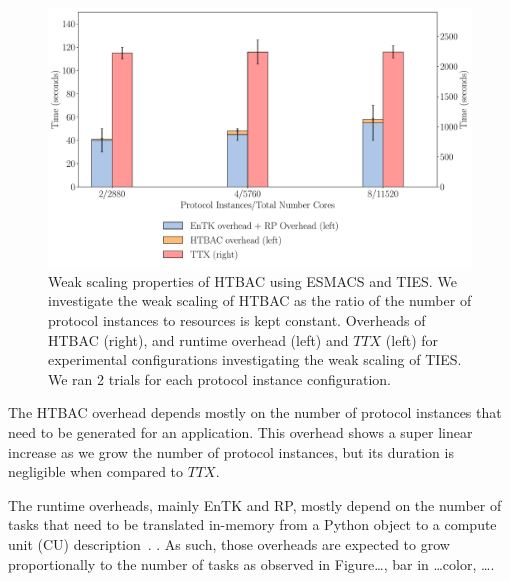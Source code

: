 \begin{figure}
  \centering
    \includegraphics[width=\columnwidth]{figures/new_ws_esmacs_ties.pdf}
    \caption{Weak scaling properties of HTBAC using ESMACS and TIES. We
    investigate the weak scaling of HTBAC as the ratio of the number of
    protocol instances to resources is kept constant. Overheads of HTBAC
    (right), and runtime overhead (left) and \(TTX\) (left) for experimental
    configurations investigating the weak scaling of TIES. We ran 2 trials
    for each protocol instance configuration.}
\label{fig:weak_scaling_ESMACS_TIES}
\end{figure}


The HTBAC overhead depends mostly on the number of protocol instances that
need to be generated for an application. This overhead shows a super linear
increase as we grow the number of protocol instances, but its duration is
negligible when compared to \(TTX\).


The runtime overheads, mainly EnTK and RP, mostly depend on the number of
tasks that need to be translated in-memory from a Python object to a compute
unit (CU) description~\cite{dakka2017}. 
. As such, those overheads are expected to grow proportionally to
the number of tasks as observed in Figure\ldots, bar in \ldots color, \ldots. 


